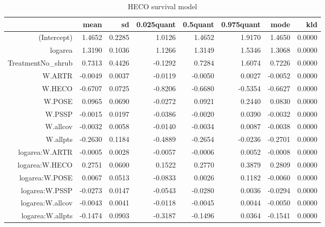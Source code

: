 \begin{table}[ht]
\centering
\begin{tabular}{rrrrrrrr}
  \hline
 & mean & sd & 0.025quant & 0.5quant & 0.975quant & mode & kld \\ 
  \hline
(Intercept) & 1.4652 & 0.2285 & 1.0126 & 1.4652 & 1.9170 & 1.4650 & 0.0000 \\ 
  logarea & 1.3190 & 0.1036 & 1.1266 & 1.3149 & 1.5346 & 1.3068 & 0.0000 \\ 
  TreatmentNo\_shrub & 0.7313 & 0.4426 & -0.1292 & 0.7284 & 1.6074 & 0.7226 & 0.0000 \\ 
  W.ARTR & -0.0049 & 0.0037 & -0.0119 & -0.0050 & 0.0027 & -0.0052 & 0.0000 \\ 
  W.HECO & -0.6707 & 0.0725 & -0.8206 & -0.6680 & -0.5354 & -0.6627 & 0.0000 \\ 
  W.POSE & 0.0965 & 0.0690 & -0.0272 & 0.0921 & 0.2440 & 0.0830 & 0.0000 \\ 
  W.PSSP & -0.0015 & 0.0197 & -0.0386 & -0.0020 & 0.0390 & -0.0032 & 0.0000 \\ 
  W.allcov & -0.0032 & 0.0058 & -0.0140 & -0.0034 & 0.0087 & -0.0038 & 0.0000 \\ 
  W.allpts & -0.2630 & 0.1184 & -0.4889 & -0.2654 & -0.0236 & -0.2701 & 0.0000 \\ 
  logarea:W.ARTR & -0.0005 & 0.0028 & -0.0057 & -0.0006 & 0.0052 & -0.0008 & 0.0000 \\ 
  logarea:W.HECO & 0.2751 & 0.0600 & 0.1522 & 0.2770 & 0.3879 & 0.2809 & 0.0000 \\ 
  logarea:W.POSE & 0.0067 & 0.0513 & -0.0833 & 0.0026 & 0.1182 & -0.0060 & 0.0000 \\ 
  logarea:W.PSSP & -0.0273 & 0.0147 & -0.0543 & -0.0280 & 0.0036 & -0.0294 & 0.0000 \\ 
  logarea:W.allcov & -0.0043 & 0.0041 & -0.0118 & -0.0045 & 0.0044 & -0.0050 & 0.0000 \\ 
  logarea:W.allpts & -0.1474 & 0.0903 & -0.3187 & -0.1496 & 0.0364 & -0.1541 & 0.0000 \\ 
   \hline
\end{tabular}
\caption{HECO survival model} 
\label{HECOsurvival}
\end{table}

